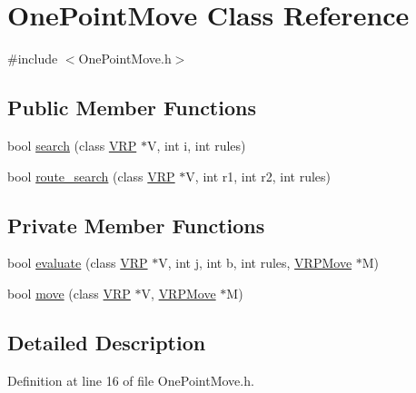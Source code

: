 \hypertarget{class_one_point_move}{
\section{OnePointMove Class Reference}
\label{class_one_point_move}
}


{\ttfamily \#include $<$OnePointMove.h$>$}

\subsection*{Public Member Functions}
\begin{DoxyCompactItemize}
\item 
bool \hyperlink{class_one_point_move_aad20db32bc90ed81288a50a68d8a5927}{search} (class \hyperlink{class_v_r_p}{VRP} $\ast$V, int i, int rules)
\item 
bool \hyperlink{class_one_point_move_a8d64259ab9c6510ecf5797286b6a37b6}{route\_\-search} (class \hyperlink{class_v_r_p}{VRP} $\ast$V, int r1, int r2, int rules)
\end{DoxyCompactItemize}
\subsection*{Private Member Functions}
\begin{DoxyCompactItemize}
\item 
bool \hyperlink{class_one_point_move_a5037df617aea774ec85755a29c5adf61}{evaluate} (class \hyperlink{class_v_r_p}{VRP} $\ast$V, int j, int b, int rules, \hyperlink{class_v_r_p_move}{VRPMove} $\ast$M)
\item 
bool \hyperlink{class_one_point_move_ae26eb12befe7faabac4e501cd1ae04e0}{move} (class \hyperlink{class_v_r_p}{VRP} $\ast$V, \hyperlink{class_v_r_p_move}{VRPMove} $\ast$M)
\end{DoxyCompactItemize}


\subsection{Detailed Description}


Definition at line 16 of file OnePointMove.h.



